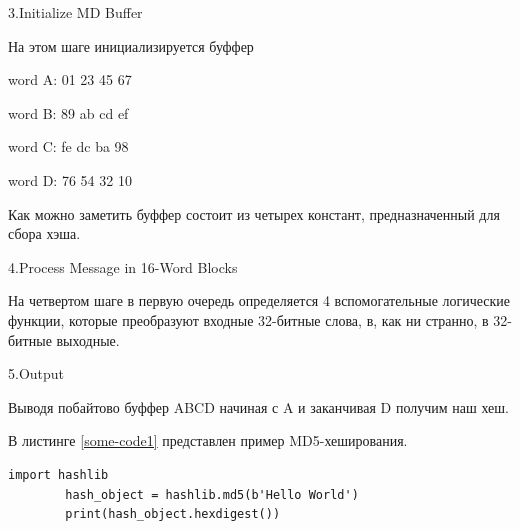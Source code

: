 \documentclass[a4paper, 12pt, oneside]{scrartcl}
\begin{document}
	3.Initialize MD Buffer\par
	На этом шаге инициализируется буффер\par
	word A: 01 23 45 67\par
	word B: 89 ab cd ef\par
	word C: fe dc ba 98\par
	word D: 76 54 32 10\par
	Как можно заметить буффер состоит из четырех констант, предназначенный для сбора хэша.\par
	4.Process Message in 16-Word Blocks\par
	На четвертом шаге в первую очередь определяется 4 вспомогательные логические функции, которые преобразуют входные 32-битные слова, в, как ни странно, в 32-битные выходные.\par

	5.Output\par
	Выводя побайтово буффер ABCD начиная с A и заканчивая D получим наш хеш.\par
	В листинге \ref{some-code1} представлен пример MD5-хеширования.\par
	
	\begin{lstlisting}[label=some-code1,caption= MD5]
		import hashlib
		hash_object = hashlib.md5(b'Hello World')
		print(hash_object.hexdigest())
	\end{lstlisting}
\end{document}
